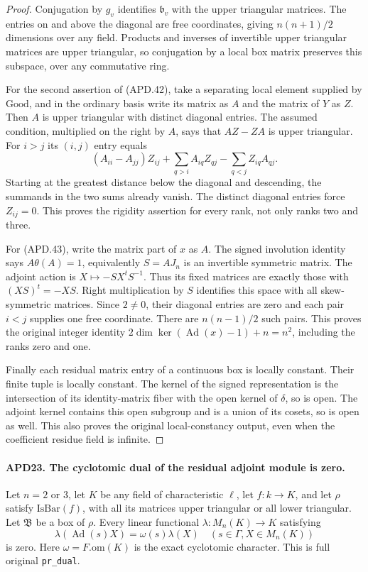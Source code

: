 \documentclass[11pt,a4paper]{article}
\numberwithin{equation}{section}
\theoremstyle{remark}\newtheorem{remark}[theorem]{Remark}
\begin{document}
\begin{proof}
Conjugation by \(g_v\) identifies \(\mathfrak b_v\) with
the upper triangular matrices.  The entries on and above the
diagonal are free coordinates, giving \(n(n+1)/2\) dimensions
over any field.  Products and inverses of invertible upper
triangular matrices are upper triangular, so conjugation by a
local box matrix preserves this subspace, over any commutative
ring.

For the second assertion of (APD.42), take a separating local
element supplied by \(\mathrm{Good}\), and in the ordinary
basis write its matrix as \(A\) and the matrix of \(Y\) as
\(Z\).  Then \(A\) is upper triangular with distinct
diagonal entries.  The assumed condition, multiplied on the
right by \(A\), says that \(AZ-ZA\) is upper triangular.
For \(i>j\) its \((i,j)\) entry equals
\[
 (A_{ii}-A_{jj})Z_{ij}
       +\sum_{q>i}A_{iq}Z_{qj}-\sum_{q<j}Z_{iq}A_{qj}.
\]
Starting at the greatest distance below the diagonal and
descending, the summands in the two sums already vanish.
The distinct diagonal entries force \(Z_{ij}=0\).  This
proves the rigidity assertion for every rank, not only ranks
two and three.

For (APD.43), write the matrix part of \(x\) as \(A\).
The signed involution identity says \(A\theta(A)=1\),
equivalently \(S=AJ_n\) is an invertible symmetric matrix.
The adjoint action is \(X\mapsto-SX^tS^{-1}\).
Thus its fixed matrices are exactly those with
\((XS)^t=-XS\).  Right multiplication by \(S\) identifies
this space with all skew-symmetric matrices.  Since \(2\ne0\),
their diagonal entries are zero and each pair \(i<j\) supplies
one free coordinate.  There are \(n(n-1)/2\) such pairs.
This proves the original integer identity
\(2\dim\ker(\operatorname{Ad}(x)-1)+n=n^2\), including
the ranks zero and one.

Finally each residual matrix entry of a continuous box is locally
constant.  Their finite tuple is locally constant.  The kernel
of the signed representation is the intersection of its
identity-matrix fiber with the open kernel of \(\delta\),
so is open.  The adjoint kernel contains this open subgroup
and is a union of its cosets, so is open as well.  This also
proves the original local-constancy output, even when the
coefficient residue field is infinite.
\end{proof}

\paragraph{APD23. The cyclotomic dual of the residual adjoint module is zero.}
\label{claim:APD23}
Let \(n=2\) or \(3\), let \(K\) be any field of
characteristic \(\ell\), let \(f:k\to K\), and let
\(\rho\) satisfy \(\mathrm{IsBar}(f)\), with all its
matrices upper triangular or all lower triangular.  Let
\(\mathfrak B\) be a box of \(\rho\).  Every linear
functional \(\lambda:M_n(K)\to K\) satisfying
\[
 \lambda(\operatorname{Ad}(s)X)
                   =\omega(s)\lambda(X)
                         \quad(s\in\Gamma,X\in M_n(K)) \tag{APD.44}
\]
is zero.  Here \(\omega=F.\mathrm{om}(K)\) is the exact
cyclotomic character.  This is full original \texttt{pr\_\allowbreak dual}.
\end{document}

